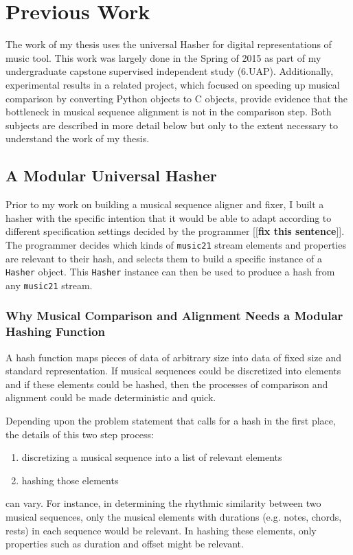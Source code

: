 \chapter{Previous Work}

The work of my thesis uses the universal Hasher for digital representations of music tool. This work was largely done in the Spring of 2015 as part of my undergraduate capstone supervised independent study (6.UAP). Additionally, experimental results in a related project, which focused on speeding up musical comparison by converting Python objects to C objects, provide evidence that the bottleneck in musical sequence alignment is not in the comparison step. Both subjects are described in more detail below but only to the extent necessary to understand the work of my thesis.

\section{A Modular Universal Hasher} \label{hasher}
Prior to my work on building a musical sequence aligner and fixer, I built a hasher with the specific intention that it would be able  to adapt according to different specification settings decided by the programmer [[\textbf{fix this sentence}]]. The programmer decides which kinds of \texttt{music21} stream elements and properties are relevant to their hash, and selects them to build a specific instance of a \texttt{Hasher} object. This \texttt{Hasher} instance can then be used to produce a hash from any \texttt{music21} stream. 

\subsection{Why Musical Comparison and Alignment Needs a Modular Hashing Function}
A hash function maps pieces of data of arbitrary size into data of fixed size and standard representation. If musical sequences could be discretized into elements and if these elements could be hashed, then the processes of comparison and alignment could be made deterministic and quick. 

Depending upon the problem statement that calls for a hash in the first place, the details of this two step process:
\begin{enumerate}
\item discretizing a musical sequence into a list of relevant elements
\item hashing those elements  
\end{enumerate}
can vary. For instance, in determining the rhythmic similarity between two musical sequences, only the musical elements with durations (e.g. notes, chords, rests) in each sequence would be relevant. In hashing these elements, only properties such as duration and offset might be relevant. 

